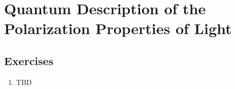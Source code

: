 \chapter{Quantum Description of the Polarization Properties of Light}
\label{chPolarization}




\section{Exercises}
\begin{enumerate}
\item TBD
\end{enumerate}
